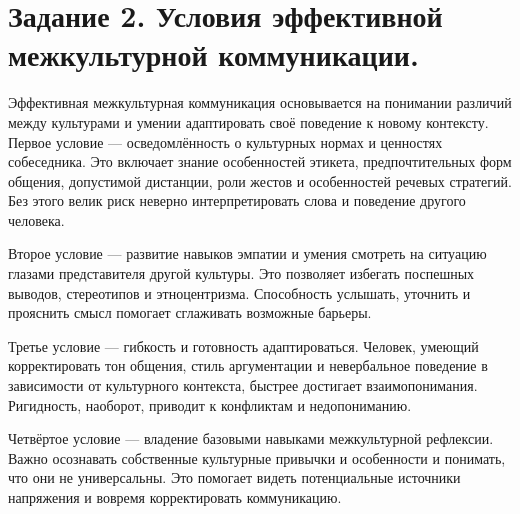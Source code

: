 \documentclass[14pt,a4paper]{extarticle}
\begin{document}
\section{Задание 2. Условия эффективной межкультурной коммуникации.}
\begin{sloppypar}
Эффективная межкультурная коммуникация основывается на понимании различий между
    культурами и умении адаптировать своё поведение к новому контексту. Первое
    условие — осведомлённость о культурных нормах и ценностях собеседника. Это
    включает знание особенностей этикета, предпочтительных форм общения,
    допустимой дистанции, роли жестов и особенностей речевых стратегий. Без
    этого велик риск неверно интерпретировать слова и поведение другого
    человека.

    Второе условие — развитие навыков эмпатии и умения смотреть на ситуацию
    глазами представителя другой культуры. Это позволяет избегать поспешных
    выводов, стереотипов и этноцентризма. Способность услышать, уточнить и
    прояснить смысл помогает сглаживать возможные барьеры.

    Третье условие — гибкость и готовность адаптироваться. Человек, умеющий
    корректировать тон общения, стиль аргументации и невербальное поведение в
    зависимости от культурного контекста, быстрее достигает взаимопонимания.
    Ригидность, наоборот, приводит к конфликтам и недопониманию.

    Четвёртое условие — владение базовыми навыками межкультурной рефлексии.
    Важно осознавать собственные культурные привычки и особенности и понимать,
    что они не универсальны. Это помогает видеть потенциальные источники
    напряжения и вовремя корректировать коммуникацию.
\end{sloppypar}
\end{document}
